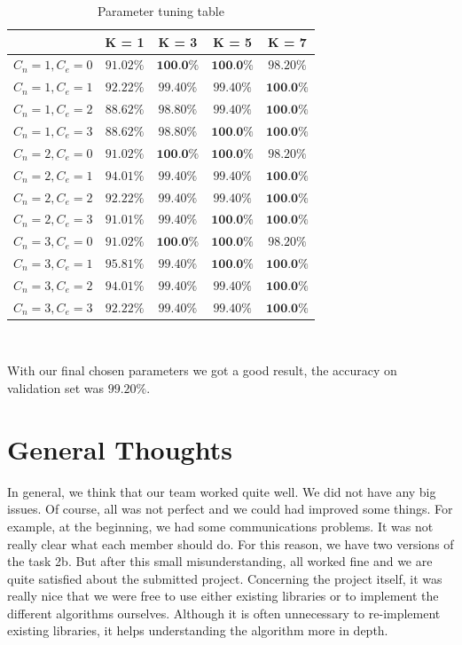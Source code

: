 \documentclass[12pt]{article}
\begin{document}
\begin{table}[h]
\centering
\begin{tabular}{|c|c|c|c|c|}
& K = 1 & K = 3 & K = 5 & K = 7\\
\hline
$C_n = 1, C_e = 0$ & $91.02\%$ & $\textbf{100.0\%}$ & $\textbf{100.0\%}$ & $98.20\%$\\
$C_n = 1, C_e = 1$ & $92.22\%$ & $99.40\%$ & $99.40\%$ & $\textbf{100.0\%}$\\
$C_n = 1, C_e = 2$ & $88.62\%$ & $98.80\%$ & $99.40\%$ & $\textbf{100.0\%}$\\
$C_n = 1, C_e = 3$ & $88.62\%$ & $98.80\%$ & $\textbf{100.0\%}$ & $\textbf{100.0\%}$\\
\hline
$C_n = 2, C_e = 0$ & $91.02\%$ & $\textbf{100.0\%}$ & $\textbf{100.0\%}$ & $98.20\%$\\
$C_n = 2, C_e = 1$ & $94.01\%$ & $99.40\%$ & $99.40\%$ & $\textbf{100.0\%}$\\
$C_n = 2, C_e = 2$ & $92.22\%$ & $99.40\%$ & $99.40\%$ & $\textbf{100.0\%}$\\
$C_n = 2, C_e = 3$ & $91.01\%$ & $99.40\%$ & $\textbf{100.0\%}$ & $\textbf{100.0\%}$\\
\hline
$C_n = 3, C_e = 0$ & $91.02\%$ & $\textbf{100.0\%}$ & $\textbf{100.0\%}$ & $98.20\%$\\
$C_n = 3, C_e = 1$ & $95.81\%$ & $99.40\%$ & $\textbf{100.0\%}$ & $\textbf{100.0\%}$\\
$C_n = 3, C_e = 2$ & $94.01\%$ & $99.40\%$ & $99.40\%$ & $\textbf{100.0\%}$\\
$C_n = 3, C_e = 3$ & $92.22\%$ & $99.40\%$ & $99.40\%$ & $\textbf{100.0\%}$\\
\end{tabular}\\
\caption{Parameter tuning table}
\label{fig:res_table}
\end{table}

With our final chosen parameters we got a good result, the accuracy on validation set was $99.20\%$.

\section*{General Thoughts}
In general, we think that our team worked quite well. We did not have any big issues. Of course, all was not perfect and we could had improved some things. For example, at the beginning, we had some communications problems. It was not really clear what each member should do. For this reason, we have two versions of the task 2b. But after this small misunderstanding, all worked fine and we are quite satisfied about the submitted project.
\newline Concerning the project itself, it was really nice that we were free to use either existing libraries or to implement the different algorithms ourselves. Although it is often unnecessary to re-implement existing libraries, it helps understanding the algorithm more in depth.
\end{document}
